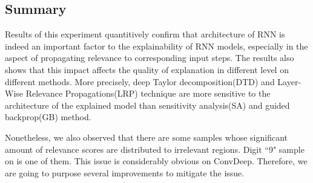 
\subsection{Summary}
Results of this experiment quantitively confirm that architecture of RNN is indeed an important factor to the explainability of RNN models, especially in the aspect of propagating relevance to corresponding input steps.  The results also shows that this impact affects the quality of explanation in different level on different methods. More precisely, deep Taylor decomposition(DTD) and Layer-Wise Relevance Propagations(LRP) technique are more sensitive to the architecture of the explained model than sensitivity analysis(SA) and guided backprop(GB) method.

Nonetheless, we  also observed that there are some samples whose significant amount of relevance scores are distributed to irrelevant regions.  Digit ``9" sample on \addfigure{\ref{fig:heatmap_msc_mix_for_thesis}} is one of them. This issue is considerably obvious on ConvDeep.   Therefore, we are going to purpose several improvements to mitigate the issue.

